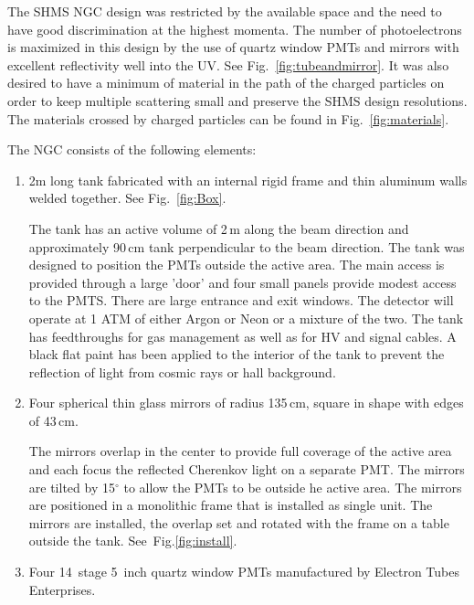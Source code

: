 {The SHMS NGC design was restricted by the available space and the need
to have good discrimination at the highest momenta.  The number of
photoelectrons is maximized in this design by the use of quartz window
PMTs and mirrors with excellent reflectivity well into the UV. See
Fig.~\ref{fig:tubeandmirror}. It was also desired to have a minimum of
material in the path of the charged particles on order to keep
multiple scattering small and preserve the SHMS design
resolutions. The materials crossed by charged particles can be found
in Fig.~\ref{fig:materials}.

\newpage
\vspace{.25in}
\vspace{.25in}

The NGC consists of the following elements:
\begin{enumerate}
\item 2m long tank fabricated with an internal rigid frame and thin
  aluminum walls welded together. See Fig.~\ref{fig:Box}.

 The tank has an active volume of 2\,m along the beam direction and
 approximately 90\,cm tank perpendicular to the beam direction. The
 tank was designed to position the PMTs outside the active area. The
 main access is provided through a large 'door' and four small panels
 provide modest access to the PMTS. There are large entrance and exit
 windows. The detector will operate at 1 ATM of either Argon or Neon
 or a mixture of the two. The tank has feedthroughs for gas
 management as well as for HV and signal cables. A black flat paint
 has been applied to the interior of the tank to prevent the
 reflection of light from cosmic rays or hall background.

\item Four spherical thin glass mirrors of radius 135\,cm, square in
  shape with edges of 43\,cm.

  The mirrors overlap in the center to provide full coverage of the
  active area and each focus the reflected Cherenkov light on a
  separate PMT. The mirrors are tilted by 15$^\circ$ to allow the PMTs
  to be outside he active area.  The mirrors are positioned in a
  monolithic frame that is installed as single unit. The mirrors are
  installed, the overlap set and rotated with the frame on a table
  outside the tank.  See~Fig.\ref{fig:install}.
\item Four 14~stage 5~inch quartz window PMTs manufactured by Electron
  Tubes Enterprises.


\end{enumerate}}
